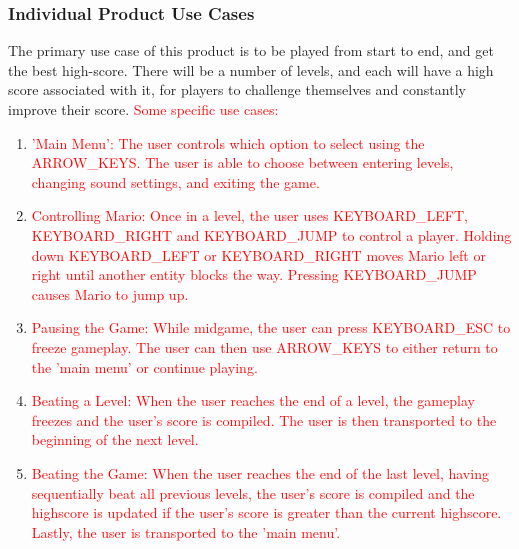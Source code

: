 \documentclass[12pt, titlepage]{article}
\begin{document}
\subsubsection{Individual Product Use Cases}
The primary use case of this product is to be played from start to end, and get the best high-score. There will be a number of levels, and each will have a high score associated with it, for players to challenge themselves and constantly improve their score.
\textcolor{red}{Some specific use cases:}
\begin{enumerate}
  \item \textcolor{red}{'Main Menu': The user controls which option to select using the ARROW\_KEYS. The user is able to choose between entering levels, changing sound settings, and exiting the game.}
  \item \textcolor{red}{Controlling Mario: Once in a level, the user uses KEYBOARD\_LEFT, KEYBOARD\_RIGHT and KEYBOARD\_JUMP to control a player. Holding down KEYBOARD\_LEFT or KEYBOARD\_RIGHT moves Mario left or right until another entity blocks the way. Pressing KEYBOARD\_JUMP causes Mario to jump up.}
  \item \textcolor{red}{Pausing the Game: While midgame, the user can press KEYBOARD\_ESC to freeze gameplay. The user can then use ARROW\_KEYS to either return to the 'main menu' or continue playing.}
  \item \textcolor{red}{Beating a Level: When the user reaches the end of a level, the gameplay freezes and the user's score is compiled. The user is then transported to the beginning of the next level.}
  \item \textcolor{red}{Beating the Game: When the user reaches the end of the last level, having sequentially beat all previous levels, the user's score is compiled and the highscore is updated if the user's score is greater than the current highscore. Lastly, the user is transported to the 'main menu'.}
\end{enumerate}
\end{document}
